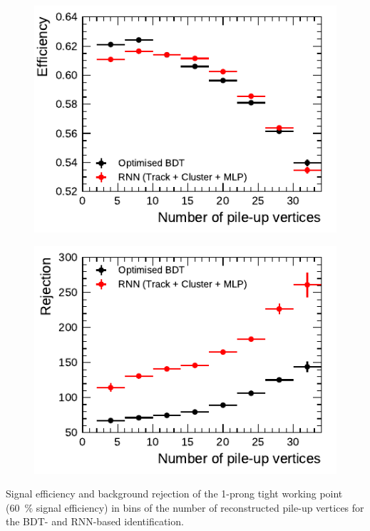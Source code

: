 \noindent
\begin{minipage}{\textwidth}
  \captionsetup{type=figure}
  \centering
  \begin{subfigure}[t]{0.48\textwidth}
    \centering
    \includegraphics{./figures/rnn/combined/pileup/rnn_tight_sig_1p.pdf}
  \end{subfigure}\hfill
  \begin{subfigure}[t]{0.48\textwidth}
    \centering
    \includegraphics{./figures/rnn/combined/pileup/rnn_tight_bkg_1p.pdf}
  \end{subfigure}
  \caption[Pile-up dependency of the BDT- and RNN-based identification
  (1-prong)]{Signal efficiency and background rejection of the 1-prong tight
    working point (\SI{60}{\percent} signal efficiency) in bins of the number of
    reconstructed pile-up vertices for the BDT- and RNN-based identification.}
\end{minipage}

